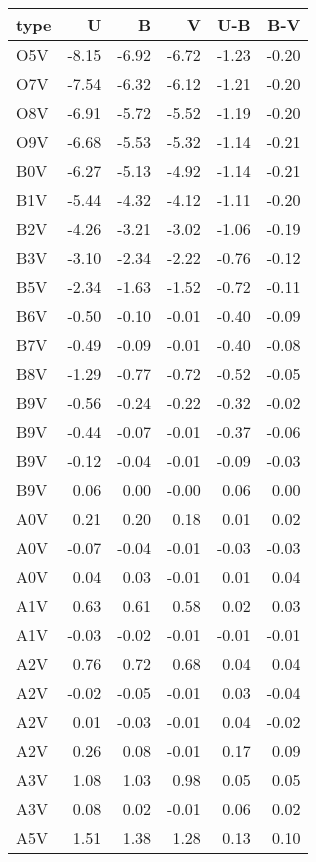 \begin{tabular}{lrrrrr}
\toprule
type &     U &     B &     V &   U-B &   B-V \\
\midrule
 O5V & -8.15 & -6.92 & -6.72 & -1.23 & -0.20 \\
 O7V & -7.54 & -6.32 & -6.12 & -1.21 & -0.20 \\
 O8V & -6.91 & -5.72 & -5.52 & -1.19 & -0.20 \\
 O9V & -6.68 & -5.53 & -5.32 & -1.14 & -0.21 \\
 B0V & -6.27 & -5.13 & -4.92 & -1.14 & -0.21 \\
 B1V & -5.44 & -4.32 & -4.12 & -1.11 & -0.20 \\
 B2V & -4.26 & -3.21 & -3.02 & -1.06 & -0.19 \\
 B3V & -3.10 & -2.34 & -2.22 & -0.76 & -0.12 \\
 B5V & -2.34 & -1.63 & -1.52 & -0.72 & -0.11 \\
 B6V & -0.50 & -0.10 & -0.01 & -0.40 & -0.09 \\
 B7V & -0.49 & -0.09 & -0.01 & -0.40 & -0.08 \\
 B8V & -1.29 & -0.77 & -0.72 & -0.52 & -0.05 \\
 B9V & -0.56 & -0.24 & -0.22 & -0.32 & -0.02 \\
 B9V & -0.44 & -0.07 & -0.01 & -0.37 & -0.06 \\
 B9V & -0.12 & -0.04 & -0.01 & -0.09 & -0.03 \\
 B9V &  0.06 &  0.00 & -0.00 &  0.06 &  0.00 \\
 A0V &  0.21 &  0.20 &  0.18 &  0.01 &  0.02 \\
 A0V & -0.07 & -0.04 & -0.01 & -0.03 & -0.03 \\
 A0V &  0.04 &  0.03 & -0.01 &  0.01 &  0.04 \\
 A1V &  0.63 &  0.61 &  0.58 &  0.02 &  0.03 \\
 A1V & -0.03 & -0.02 & -0.01 & -0.01 & -0.01 \\
 A2V &  0.76 &  0.72 &  0.68 &  0.04 &  0.04 \\
 A2V & -0.02 & -0.05 & -0.01 &  0.03 & -0.04 \\
 A2V &  0.01 & -0.03 & -0.01 &  0.04 & -0.02 \\
 A2V &  0.26 &  0.08 & -0.01 &  0.17 &  0.09 \\
 A3V &  1.08 &  1.03 &  0.98 &  0.05 &  0.05 \\
 A3V &  0.08 &  0.02 & -0.01 &  0.06 &  0.02 \\
 A5V &  1.51 &  1.38 &  1.28 &  0.13 &  0.10 \\

\end{tabular}
